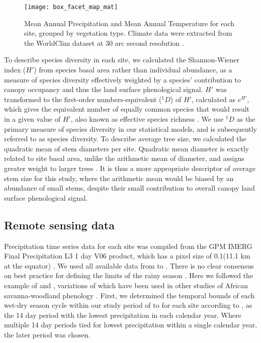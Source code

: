 \documentclass[11pt,a4paper]{article}
\begin{document}
\setlength{\tabcolsep}{2pt} %

\setlength{\tabcolsep}{4pt} %

\begin{figure}[H]
\centering
	\texttt{[image: box\_facet\_map\_mat]}
	\caption{Mean Annual Precipitation and Mean Annual Temperature for each
		site, grouped by vegetation type. Climate data were extracted from the
	    WorldClim dataset at 30 arc second resolution \citep{Fick2017}.} 
	\label{box_facet_map_mat}
\end{figure}

To describe species diversity in each site, we calculated the Shannon-Wiener
index ($H'$) from species basal area rather than individual abundance, as a
measure of species diversity effectively weighted by a species' contribution to
canopy occupancy and thus the land surface phenological signal. $H'$ was
transformed to the first-order numbers-equivalent ($^1\!D$) of $H'$, calculated
as $e^{H'}$, which gives the equivalent number of equally common species that
would result in a given value of $H'$, also known as effective species richness
\citep{Jost2007}. We use $^1\!D$ as the primary measure of species diversity in
our statistical models, and is subsequently referred to as species diversity.
To describe average tree size, we calculated the quadratic mean of stem
diameters per site. Quadratic mean diameter is exactly related to site basal
area, unlike the arithmetic mean of diameter, and assigns greater weight to
larger trees \citep{Curtis2000}. It is thus a more appropriate descriptor of
average stem size for this study, where the arithmetic mean would be biased by
an abundance of small stems, despite their small contribution to overall canopy
land surface phenological signal. 

\subsection{Remote sensing data}

Precipitation time series data for each site was compiled from the GPM IMERG
Final Precipitation L3 1 day V06 product, which has a pixel size of
0.1\textdegree (11.1 km at the equator) \citep{IMERG}. We used all available
data from \modisStart{} to \modisEnd{}. There is no clear consensus on best
practice for defining the limits of the rainy season \citep{Guan2014}. Here we
followed the example of \citet{Stern1981} and \citet{Adole2018a}, variations of
which have been used in other studies of African savanna-woodland phenology
\citep{Mupangwa2011, Segele2005}. First, we determined the temporal bounds of
each wet-dry season cycle within our study period of \modisStart{} to
\modisEnd{} for each site according to \citet{Ferijal2022}, as the 14 day
period with the lowest precipitation in each calendar year. Where multiple 14
day periods tied for lowest precipitation within a single calendar year, the
later period was chosen. 
\end{document}
